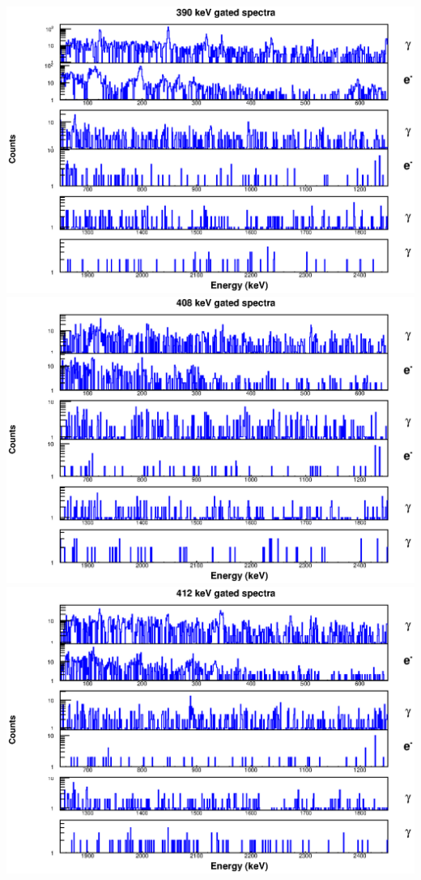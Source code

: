 \includegraphics[scale=0.8]{154Gd_Appendix/390_combined.eps}
\includegraphics[scale=0.8]{154Gd_Appendix/408_combined.eps}
\includegraphics[scale=0.8]{154Gd_Appendix/412_combined.eps}
